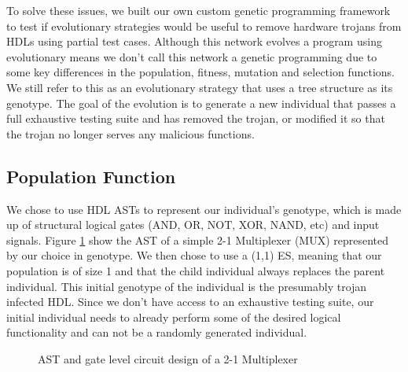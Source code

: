 \documentclass[conference]{IEEEtran}
\begin{document}
{\par To solve these issues, we built our own custom genetic programming framework to test if evolutionary strategies would be useful to remove hardware trojans from HDLs using partial test cases. 
Although this network evolves a program using evolutionary means we don't call this network a genetic programming due to some key differences in the population, fitness, mutation and selection functions. 
We still refer to this as an evolutionary strategy that uses a tree structure as its genotype.
The goal of the evolution is to generate a new individual that passes a full exhaustive testing suite and has removed the trojan, or modified it so that the trojan no longer serves any malicious functions. 


\subsection{Population Function}
\label{net:population}
\par We chose to use HDL ASTs to represent our individual's genotype, which is made up of structural logical gates (AND, OR, NOT, XOR, NAND, etc) and input signals. 
Figure \ref{fig:2-1_mux} show the AST of a simple 2-1 Multiplexer (MUX) represented by our choice in genotype.
We then chose to use a (1,1) ES, meaning that our population is of size 1 and that the child individual always replaces the parent individual. 
This initial genotype of the individual is the presumably trojan infected HDL. 
Since we don't have access to an exhaustive testing suite, our initial individual needs to already perform some of the desired logical functionality and can not be a randomly generated individual.

\begin{figure}[htb]
    \centering
    \caption{AST and gate level circuit design of a 2-1 Multiplexer}
    \label{fig:2-1_mux}
\end{figure}


}
\end{document}
